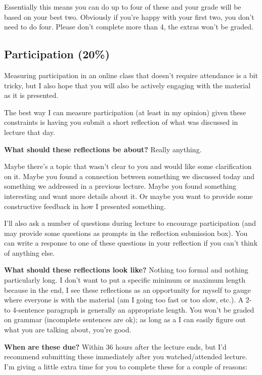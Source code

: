 \documentclass[
]{book}
\begin{document}
Essentially this means you can do up to four of these and your grade will be based on your best two. Obviously if you're happy with your first two, you don't need to do four. Please don't complete more than 4, the extras won't be graded.

\hypertarget{participation-20}{%
\subsection{Participation (20\%)}\label{participation-20}}

Measuring participation in an online class that doesn't require attendance is a bit tricky, but I also hope that you will also be actively engaging with the material as it is presented.

The best way I can measure participation (at least in my opinion) given these constraints is having you submit a short reflection of what was discussed in lecture that day.

\textbf{What should these reflections be about?} Really anything.

Maybe there's a topic that wasn't clear to you and would like some clarification on it. Maybe you found a connection between something we discussed today and something we addressed in a previous lecture. Maybe you found something interesting and want more details about it. Or maybe you want to provide some constructive feedback in how I presented something.

I'll also ask a number of questions during lecture to encourage participation (and may provide some questions as prompts in the reflection submission box). You can write a response to one of these questions in your reflection if you can't think of anything else.

\textbf{What should these reflections look like?} Nothing too formal and nothing particularly long. I don't want to put a specific minimum or maximum length because in the end, I see these reflections as an opportunity for myself to gauge where everyone is with the material (am I going too fast or too slow, etc.). A 2- to 4-sentence paragraph is generally an appropriate length. You won't be graded on grammar (incomplete sentences are ok); as long as a I can easily figure out what you are talking about, you're good.

\textbf{When are these due?} Within 36 hours after the lecture ends, but I'd recommend submitting these immediately after you watched/attended lecture. I'm giving a little extra time for you to complete these for a couple of reasons:
\end{document}
